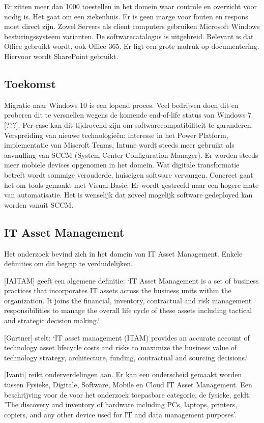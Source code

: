 Er zitten meer dan 1000 toestellen in het domein waar controle en overzicht voor nodig is. Het gaat om een ziekenhuis. Er is geen marge voor fouten en respons moet direct zijn.
Zowel Servers als client computers gebruiken Microsoft Windows besturingssysteem varianten. De softwarecatalogus is uitgebreid. Relevant is dat Office gebruikt wordt, ook Office 365.
Er ligt een grote nadruk op documentering. Hiervoor wordt SharePoint gebruikt.

\subsection{Toekomst}

Migratie naar Windows 10 is een lopend proces. Veel bedrijven doen dit en proberen dit te versnellen wegens de komende end-of-life status van Windows 7 [???]. Per case kan dit tijdrovend zijn om softwarecompatibiliteit te garanderen.
Verspreiding van nieuwe technologieën: interesse in het Power Platform, implementatie van Miscroft Teams, Intune wordt steeds meer gebruikt als aavnulling van SCCM (System Center Configuration Manager). Er worden steeds meer mobiele devices opgenomen in het domein.
Wat digitale transformatie betreft wordt sommige verouderde, huiseigen software vervangen. Concreet gaat het om tools gemaakt met Visual Basic.
Er wordt gestreefd naar een hogere mate van automatisatie. Het is wenselijk dat zoveel mogelijk software gedeployed kan worden vanuit SCCM.

\subsection{IT Asset Management}

Het onderzoek bevind zich in het domein van IT Asset Management. Enkele definities om dit begrip te verduidelijken.

[IAITAM] geeft een algemene definitie: `IT Asset Management is a set of business practices that incorporates IT assets across the business units within the organization. It joins the financial, inventory, contractual and risk management responsibilities to manage the overall life cycle of these assets including tactical and strategic decision making.`

[Gartner] stelt: `IT asset management (ITAM) provides an accurate account of technology asset lifecycle costs and risks to maximize the business value of technology strategy, architecture, funding, contractual and sourcing decisions.`

[Ivanti] reikt onderverdelingen aan. Er kan een onderscheid gemaakt worden tussen Fysieke, Digitale, Software, Mobile en Cloud IT Asset Management.
Een beschrijving voor de voor het onderzoek toepasbare categorie, de fysieke, geldt: 'The discovery and inventory of hardware including PCs, laptops, printers, copiers, and any other device used for IT and data management purposes'.

